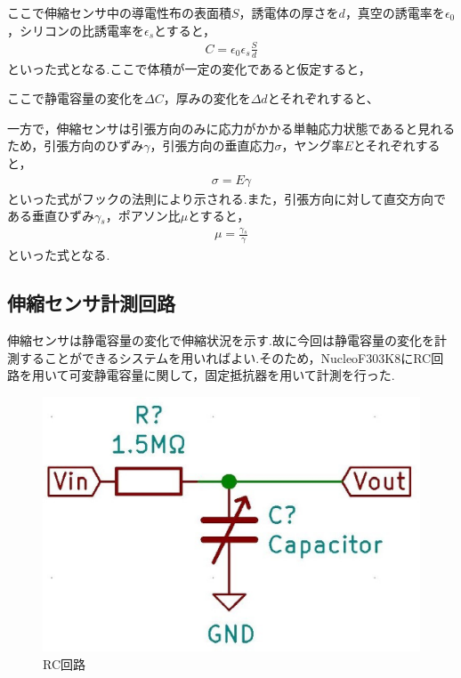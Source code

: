 ここで伸縮センサ中の導電性布の表面積$S$，誘電体の厚さを$d$，真空の誘電率を$\epsilon{}_0$，シリコンの比誘電率を$\epsilon{}_s$とすると，
\begin{eqnarray}
    C=\epsilon{}_0\epsilon{}_s\frac{S}{d}
\end{eqnarray}
といった式となる.ここで体積が一定の変化であると仮定すると， 

ここで静電容量の変化を$\Delta{}C$，厚みの変化を$\Delta{}d$とそれぞれすると、

一方で，伸縮センサは引張方向のみに応力がかかる単軸応力状態であると見れるため，引張方向のひずみ$\gamma$，引張方向の垂直応力$\sigma$，ヤング率$E$とそれぞれすると，
\begin{eqnarray}
    \sigma=E\gamma
    \label{フックの法則}
\end{eqnarray}
といった式がフックの法則により示される.また，引張方向に対して直交方向である垂直ひずみ$\gamma{}_s$，ポアソン比$\mu$とすると，
\begin{eqnarray}
    \mu = \frac{\gamma{}_s}{\gamma}
    \label{ポアソン比}
\end{eqnarray}
といった式となる.

\subsection{伸縮センサ計測回路}
伸縮センサは静電容量の変化で伸縮状況を示す.故に今回は静電容量の変化を計測することができるシステムを用いればよい.そのため，NucleoF303K8にRC回路を用いて可変静電容量に関して，固定抵抗器を用いて計測を行った.

\begin{figure}[h]
 \begin{center}
  \includegraphics[width=0.75\columnwidth,clip]{Photo/2.実験方法/RC.eps}
  \caption{RC回路}
  \label{RC}
 \end{center}
\end{figure}

